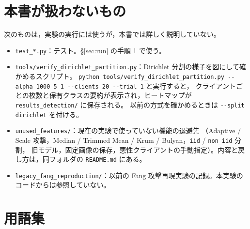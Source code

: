\documentclass[a4j, dvipdfmx]{jsarticle}  %
\begin{document}
\section{本書が扱わないもの}

次のものは，実験の実行には使うが，本書では詳しく説明していない。

\begin{itemize}
  \item \texttt{test\_*.py}：テスト。\S\ref{sec:run} の手順 1 で使う。
  \item \texttt{tools/verify\_dirichlet\_partition.py}：Dirichlet 分割の様子を図にして確かめるスクリプト。
        \texttt{python tools/verify\_dirichlet\_partition.py -{}-alpha 1000 5 1 -{}-clients 20 -{}-trial 1} と実行すると，
        クライアントごとの枚数と保有クラスの要約が表示され，ヒートマップが \texttt{results\_detection/} に保存される。
        以前の方式を確かめるときは \texttt{-{}-split dirichlet} を付ける。
  \item \texttt{unused\_features/}：現在の実験で使っていない機能の退避先
        （Adaptive / Scale 攻撃，Median / Trimmed Mean / Krum / Bulyan，\texttt{iid} / \texttt{non\_iid} 分割，
        旧モデル，固定画像の保存，悪性クライアントの手動指定）。内容と戻し方は，同フォルダの \texttt{README.md} にある。
  \item \texttt{legacy\_fang\_reproduction/}：以前の Fang 攻撃再現実験の記録。本実験のコードからは参照していない。
\end{itemize}

\section{用語集}
\label{sec:glossary}
\end{document}
